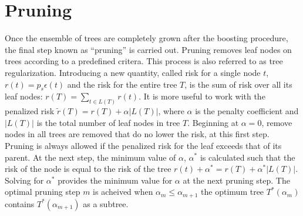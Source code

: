 \section{Pruning}
Once the ensemble of trees are completely grown after the boosting procedure, the final step known as ``pruning'' is carried out. Pruning removes leaf nodes on trees according
to a predefined critera. This process is also referred to as tree regularization. Introducing a new quantity, called risk for a single node $t$, $r(t) = p_{s}\epsilon(t)$
and the risk for the entire tree $T$, is the sum of risk over all its leaf nodes: $r(T) = \sum_{t \in L(T)} r(t)$. It is
more useful to work with the penalized risk $\widetilde{r}(T) = r(T) + \alpha|L(T)|$, where $\alpha$ is the penalty coefficient and $|L(T)|$ is the total number
of leaf nodes in tree $T$. Beginning at $\alpha = 0$, remove nodes in all trees are removed that do no lower the risk, at this first step. 
Pruning is always allowed if the penalized risk for the leaf exceeds that of its parent. At the next step, the minimum value of $\alpha$, $\alpha^{*}$ is calculated such that
the risk of the node is equal to the risk of the tree $r(t) + \alpha^{*} = r(T) + \alpha^{*}|L(T)|$. Solving for $\alpha^{*}$ provides the minimum value for $\alpha$
at the next pruning step. The optimal pruning step $m$ is acheived when $\alpha_{m} \le \alpha_{m+1}$ the optimum tree $T^{*}(\alpha_{m})$ contains $T^{*}(\alpha_{m+1})$
as a subtree. 


